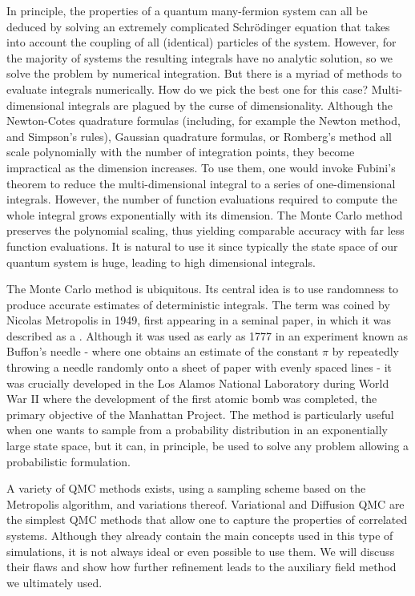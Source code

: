 In principle, the properties of a quantum many-fermion system can all be deduced by solving an extremely complicated Schr\"odinger equation that takes into account the coupling of all (identical) particles of the system.
However, for the majority of systems the resulting integrals have no analytic solution, so we solve the problem by numerical integration.
But there is a myriad of methods to evaluate integrals numerically.
How do we pick the best one for this case? 
Multi-dimensional integrals are plagued by the curse of dimensionality.
Although the Newton-Cotes quadrature formulas (including, for example the Newton method, and Simpson's rules), Gaussian quadrature formulas, or Romberg's method all scale polynomially with the number of integration points, they become impractical as the dimension increases.
To use them, one would invoke Fubini's theorem to reduce the multi-dimensional integral to a series of one-dimensional integrals.
However, the number of function evaluations required to compute the whole integral grows exponentially with its dimension.
The Monte Carlo method preserves the polynomial scaling, thus yielding comparable accuracy with far less function evaluations.
It is natural to use it since typically the state space of our quantum system is huge, leading to high dimensional integrals.

The Monte Carlo method is ubiquitous.
Its central idea is to use randomness to produce accurate estimates of deterministic integrals.
The term was coined by Nicolas Metropolis in 1949, first appearing in a seminal paper, in which it was described as a \cite{metropolis_monte_1949}.
Although it was used as early as 1777 in an experiment known as Buffon's needle - where one obtains an estimate of the constant $\pi$ by repeatedly throwing a needle randomly onto a sheet of paper with evenly spaced lines - it was crucially developed in the Los Alamos National Laboratory during World War II where the development of the first atomic bomb was completed, the primary objective of the Manhattan Project.
The method is particularly useful when one wants to sample from a probability distribution in an exponentially large state space, but it can, in principle, be used to solve any problem allowing a probabilistic formulation.

A variety of \ac{QMC} methods exists, using a sampling scheme based on the Metropolis algorithm, and variations thereof.
Variational and Diffusion \ac{QMC} are the simplest \ac{QMC} methods that allow one to capture the properties of correlated systems.
Although they already contain the main concepts used in this type of simulations, it is not always ideal or even possible to use them. 
We will discuss their flaws and show how further refinement leads to the auxiliary field method we ultimately used.

